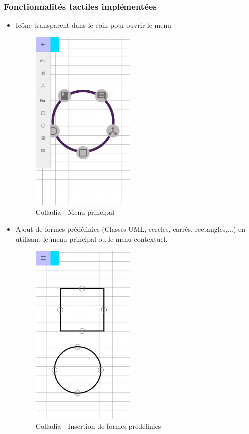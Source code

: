 \subsubsection{Fonctionnalités tactiles implémentées}
\begin{itemize}
\item Icône transparent dans le coin pour ouvrir le menu
		\begin{figure}[!h]
			\centering
			\includegraphics[width=5cm]{img/screen/colladia_draw_view_menu_main}
			\caption{Colladia - Menu principal}
		\end{figure}
\item Ajout de formes prédéfinies (Classes UML, cercles, carrés, rectangles,...) en utilisant le menu principal ou le menu contextuel.
		\begin{figure}[!h]
			\centering
			\includegraphics[width=5cm]{img/screen/colladia_draw_view_element_2}
			\caption{Colladia - Insertion de formes prédéfinies}
		\end{figure}



\end{itemize}
